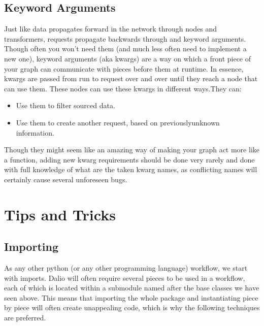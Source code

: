 \documentclass[letterpaper,10pt,english]{sphinxmanual}
\begin{document}
\subsection{Keyword Arguments}
\label{\detokenize{beginners-guide:keyword-arguments}}
Just like data propagates forward in the network through nodes and transformers, requests propagate backwards through  and  keyword arguments. Though often you won’t need them (and much less often need to implement a new one), keyword arguments (aka kwargs) are a way on which a front piece of your graph can communicate with pieces before them at runtime. In essence, kwargs are passed from run to request over and over until they reach a node that can use them. These nodes can use these kwargs in different ways.They can:
\begin{itemize}
\item {} 
Use them to filter sourced data.

\item {} 
Use them to create another request, based on previously\sphinxhyphen{}unknown information.

\end{itemize}

Though they might seem like an amazing way of making your graph act more like a function, adding new kwarg requirements should be done very rarely and done with full knowledge of what are the taken kwarg names, as conflicting names will certainly cause several unforeseen bugs.


\section{Tips and Tricks}
\label{\detokenize{beginners-guide:tips-and-tricks}}

\subsection{Importing}
\label{\detokenize{beginners-guide:importing}}
As any other python (or any other programming language) workflow, we start with imports. Dal\sphinxhyphen{}io will often require several pieces to be used in a workflow, each of which is located within a submodule named after the base classes we have seen above. This means that importing the whole  package and instantiating piece by piece will often create unappealing code, which is why the following techniques are preferred.
\end{document}
